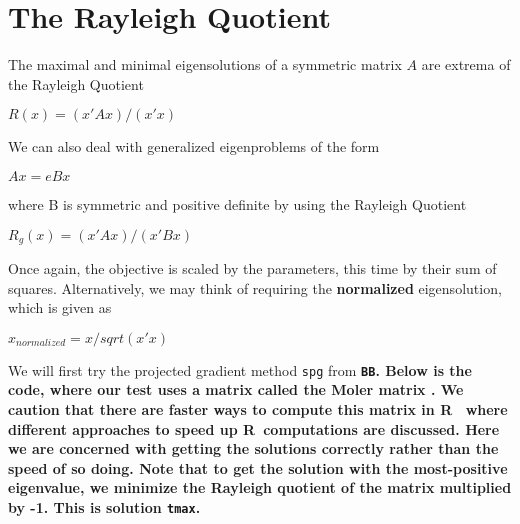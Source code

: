 \documentclass[11pt]{article}
\newcommand{\B}[1]{{\bf #1 \rm}}
\newcommand{\R}{{\sf R}}
\newcommand{\code}[1]{{\tt#1}}
\newcommand{\pkg}[1]{\bf{\tt#1}\rm }
\begin{document}
\section{The Rayleigh Quotient}

The maximal and minimal eigensolutions of a symmetric matrix $A$ are extrema of the Rayleigh Quotient

$ R(x) =  (x' A x)  / (x' x) $

We can also deal with generalized eigenproblems of the form 

$A x = e B x$

where B is symmetric and positive definite by using the Rayleigh Quotient

$ R_g(x) =  (x' A x)  / (x' B x) $


Once again, the objective is scaled by the parameters, this time by their 
sum of squares. Alternatively, 
we may think of requiring the \B{normalized} eigensolution, which is given as 

$ x_{normalized} = x/sqrt(x' x) $

We will first try the projected gradient method \code{spg} from \pkg{BB}. 
Below is the code, where our test uses
a matrix called the Moler matrix \cite[Appendix 1]{cnm79}. We caution that there
are faster ways to compute this matrix in \R\ \citep{RQtimes12} where different
approaches to speed up \R\ computations are discussed. Here we are concerned 
with getting the solutions correctly rather than the speed of so doing. Note
that to get the solution with the most-positive eigenvalue, we minimize the
Rayleigh quotient of the matrix multiplied by -1. This is solution \code{tmax}.
\end{document}
